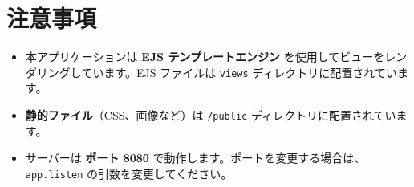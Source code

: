 \documentclass{article}
\begin{document}
\section*{注意事項}
\begin{itemize}
    \item 本アプリケーションは \textbf{EJS テンプレートエンジン} を使用してビューをレンダリングしています。EJS ファイルは \texttt{views} ディレクトリに配置されています。
    \item \textbf{静的ファイル}（CSS、画像など）は \texttt{/public} ディレクトリに配置されています。
    \item サーバーは \textbf{ポート 8080} で動作します。ポートを変更する場合は、\texttt{app.listen} の引数を変更してください。
\end{itemize}
\end{document}
